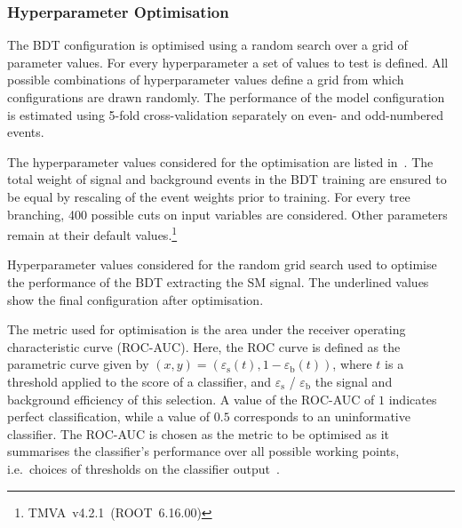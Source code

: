 \subsubsection{Hyperparameter Optimisation}

The BDT configuration is optimised using a random search over a grid
of parameter values. For every hyperparameter a set of values to test
is defined. All possible combinations of hyperparameter values define
a grid from which configurations are drawn randomly. The performance
of the model configuration is estimated using 5-fold cross-validation
separately on even- and odd-numbered events.

The hyperparameter values considered for the optimisation are listed
in~. The total weight of signal and background
events in the BDT training are ensured to be equal by rescaling of the event
weights prior to training.
For every tree branching, 400 possible cuts on input variables are
considered. Other parameters remain at their default
values.\footnote{TMVA~v4.2.1~(ROOT~6.16.00)}

\begin{table}[htbp]
  \centering

  \caption[Hyperparameter values of the BDT extracting the SM~\HH signal in the
  \hadhad channel.]{Hyperparameter values considered for the random grid search
    used to optimise the performance of the BDT extracting the SM \HH
    signal. The underlined values show the final configuration after
    optimisation.}%
  \label{tab:hyperparameter_grid_bdt}

  
\end{table}

The metric used for optimisation is the area under the receiver operating
characteristic curve (ROC-AUC). Here, the ROC curve is defined
as the parametric curve given by
$(x, y) = \left( \varepsilon_{\text{s}}(t), 1 -
  \varepsilon_{\text{b}}(t) \right)$, where $t$ is a threshold applied
to the score of a classifier, and $\varepsilon_\text{s}$ /
$\varepsilon_\text{b}$ the signal and background efficiency of this
selection. A value of the ROC-AUC of $1$ indicates perfect
classification, while a value of $0.5$ corresponds to an uninformative
classifier. The ROC-AUC is chosen as the metric to be optimised as it
summarises the classifier's performance over all possible working
points, i.e.\ choices of thresholds on the classifier
output~\cite{james13}.

